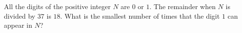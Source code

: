 All the digits of the positive integer $N$ are $0$ or $1$. The remainder when $N$ is divided by $37$ is $18$. What is the smallest number of times that the digit $1$ can appear in $N$?
